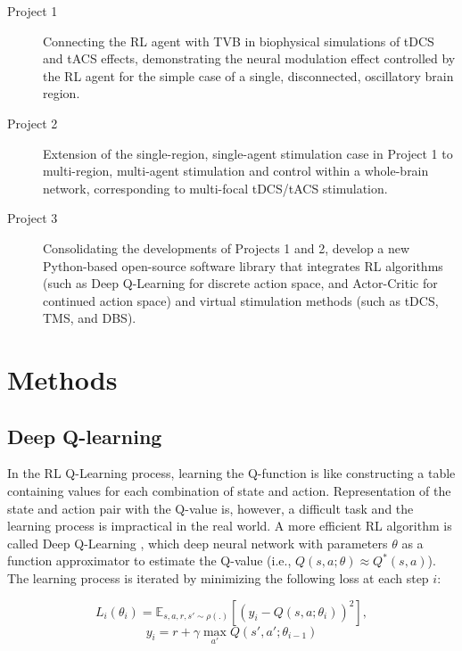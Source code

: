 \documentclass[12pt, a4paper]{article}
\begin{document}
\begin{description}
	\item[Project 1] Connecting the RL agent with TVB in biophysical simulations of tDCS and tACS effects, demonstrating the neural modulation effect controlled by the RL agent for the simple case of a single, disconnected, oscillatory brain region.
	\item[Project 2] Extension of the single-region, single-agent stimulation case in Project 1 to multi-region, multi-agent stimulation and control within a whole-brain network, corresponding to multi-focal tDCS/tACS stimulation.
	\item[Project 3] Consolidating the developments of Projects 1 and 2, develop a new Python-based open-source software library that integrates RL algorithms (such as Deep Q-Learning for discrete action space, and Actor-Critic for continued action space) and virtual stimulation methods (such as tDCS, TMS, and DBS).
\end{description}


\section*{Methods} %
\subsection*{Deep Q-learning}
In the RL Q-Learning process, learning the Q-function is like constructing a table containing values for each combination of state and action. Representation of the state and action pair with the Q-value is, however, a difficult task and the learning process is impractical in the real world. A more efficient RL algorithm is called Deep Q-Learning \parencite{mnihHumanlevelControlDeep2015}, which deep neural network with parameters $\theta$ as a function approximator to estimate the Q-value (i.e., $Q(s,a;\theta)\approx Q^{*}({s},{a})$). The learning process is iterated by minimizing the following loss at each step $i$:

\begin{equation*}
	L_i(\theta_i) = \mathbb{E}_{s,a,r,s' \sim \rho(.)} \left [ (y_i - Q(s,a;\theta_i))^2 \right ],
\end{equation*}
\begin{equation*}
	y_i = r + \gamma \max_{{a'}} {Q(s',a';\theta_{i-1})}
\end{equation*}
\end{document}
